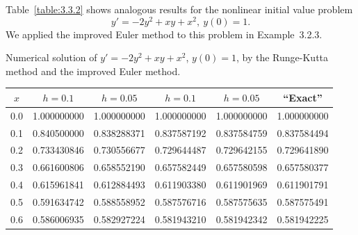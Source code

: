 \setcounter{example}{2}
\begin{example}
  \label{example:3.3.3} \rm Table~\ref{table:3.3.2} shows analogous results for the nonlinear
  initial value problem
  \[
    y'=-2y^{2}+xy+x^{2},\ y(0)=1.
  \]
  We applied the improved Euler method to this problem in Example~3.2.3.
\end{example}
\setcounter{table}{1}
\begin{examplesolution}
\begin{newtable}
  \label{table:3.3.2} Numerical solution of $y'=-2y^{2}+xy+x^{2}$, $y(0)=1$, by the Runge-Kutta
  method and the improved Euler method.
  \begin{center}
    \begin{tabular}{|c|r|r|r|r|r|}
      \hline
      \multicolumn{1}{|c|}{$x$} & \multicolumn{1}{|c|}{$h=0.1$}       & \multicolumn{1}{|c|}{$h=0.05$}   & \multicolumn{1}{|c|}{$h=0.1$} & \multicolumn{1}{|c|}{$h=0.05$} & \multicolumn{1}{|c|}{``Exact''} \\
      \hline
      0.0                       & 1.000000000                         & 1.000000000                      & 1.000000000                   & 1.000000000                    & 1.000000000                     \\
      0.1                       & 0.840500000                         & 0.838288371                      & 0.837587192                   & 0.837584759                    & 0.837584494                     \\
      0.2                       & 0.733430846                         & 0.730556677                      & 0.729644487                   & 0.729642155                    & 0.729641890                     \\
      0.3                       & 0.661600806                         & 0.658552190                      & 0.657582449                   & 0.657580598                    & 0.657580377                     \\
      0.4                       & 0.615961841                         & 0.612884493                      & 0.611903380                   & 0.611901969                    & 0.611901791                     \\
      0.5                       & 0.591634742                         & 0.588558952                      & 0.587576716                   & 0.587575635                    & 0.587575491                     \\
      0.6                       & 0.586006935                         & 0.582927224                      & 0.581943210                   & 0.581942342                    & 0.581942225                     \\

\end{tabular}
\end{center}
\end{newtable}
\end{examplesolution}
